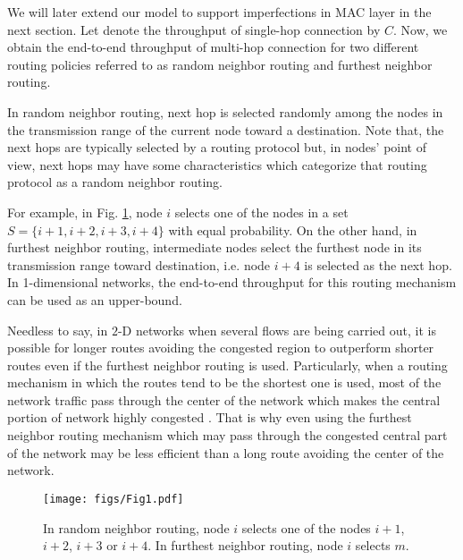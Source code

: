 \documentclass[12pt, draftclsnofoot, onecolumn]{IEEEtran}
\begin{document}
We will later extend our model 
to support imperfections in MAC layer in the next section. Let denote the 
throughput of single-hop connection by $C$. Now, we obtain the 
end-to-end throughput of multi-hop connection for two different routing policies
referred to as random neighbor routing and furthest neighbor routing. 

In random neighbor routing, next hop is selected randomly among 
the nodes in the transmission range of the current node toward a destination. 
Note that, the next hops are typically selected 
by a routing protocol but, in nodes’ point of view, next hops may have some characteristics 
which categorize that routing protocol as a random neighbor routing.

For example, in Fig. \ref{fig1}, node $i$ selects one 
of the nodes in a set $S=\{i+1,i+2,i+3,i+4\}$ with equal probability.
On the other hand, in furthest neighbor routing, intermediate nodes select 
the furthest node in its transmission range toward destination, i.e. node $i+4$ 
is selected as the next hop.
In 1-dimensional networks, the end-to-end throughput for this 
routing mechanism can be used as an upper-bound. 

Needless to say, in $2$-D networks when several flows are being carried out, it is 
possible for longer routes avoiding the congested region to outperform shorter 
routes even if the furthest neighbor routing is used. Particularly, when 
a routing mechanism in which the routes tend to be the shortest one is used, 
most of the network traffic pass through the center of the network which makes 
the central portion of network highly congested \cite{mei2009routing}. 
That is why even using the furthest neighbor routing mechanism which may pass 
through the congested central part of the network may be less efficient than a long 
route avoiding the center of the network.


\begin{figure}
\centering
\texttt{[image: figs/Fig1.pdf]}
\caption{In random neighbor routing, node $i$ selects one of the 
nodes $i+1$, $i+2$, $i+3$ or $i+4$. In furthest neighbor routing, node $i$ selects $m$.}
\label{fig1}
\end{figure}
\end{document}
